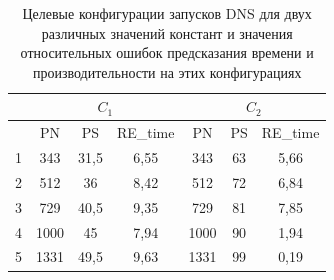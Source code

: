 			\begin{table}
				\centering
				\begin{tabular}{|r||c|c|c||c|c|c|}
					\hline
					            & \multicolumn{3}{|c||}{\(C_1\)} & \multicolumn{3}{c|}{\(C_2\)} \\ \hline
					\textnumero & PN   & PS   & RE\_time        & PN   & PS & RE\_time          \\ \hline
					1           & 343  & 31,5 & 6,55            & 343  & 63 & 5,66              \\ \hline
					2           & 512  & 36   & 8,42            & 512  & 72 & 6,84              \\ \hline
					3           & 729  & 40,5 & 9,35            & 729  & 81 & 7,85              \\ \hline
					4           & 1000 & 45   & 7,94            & 1000 & 90 & 1,94              \\ \hline
					5           & 1331 & 49,5 & 9,63            & 1331 & 99 & 0,19              \\ \hline
				\end{tabular}
				\caption{Целевые конфигурации запусков DNS для двух различных значений констант и значения относительных ошибок предсказания времени и производительности на этих конфигурациях}
				\label{target_DNS}
			\end{table}
